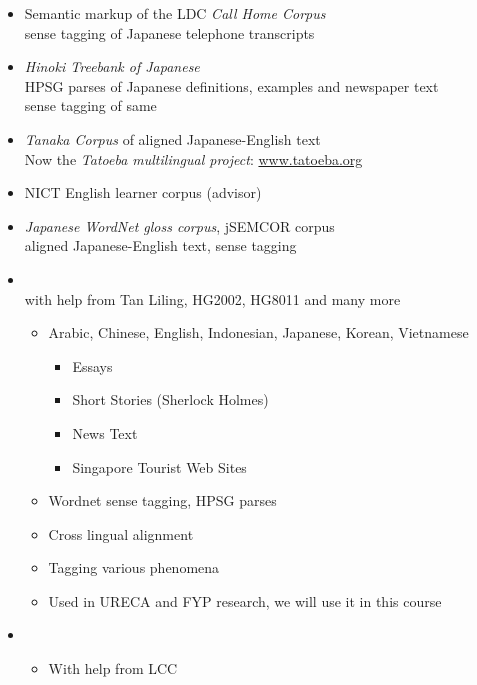 \documentclass[a4paper,landscape,headrule,footrule,xetex]{foils}
\begin{document}
\begin{itemize}
\item Semantic markup of the LDC \textit{Call Home Corpus}
\\ sense tagging of Japanese telephone transcripts
\item \textit{Hinoki Treebank of Japanese}
\\ HPSG parses of Japanese definitions, examples and newspaper text
\\ sense tagging of same
\item \textit{Tanaka Corpus} of aligned Japanese-English text
\\ Now the \textit{Tatoeba multilingual project}: \url{www.tatoeba.org}
\item NICT English learner corpus (advisor)
\item \textit{Japanese WordNet gloss corpus}, jSEMCOR corpus
\\  aligned Japanese-English text, sense tagging
\end{itemize}

\begin{itemize}
\item \textbf{}
\\ with help from Tan Liling, HG2002, HG8011 and many more
  \begin{itemize}
  \item Arabic, Chinese, English, Indonesian, Japanese, Korean, Vietnamese
    \begin{itemize}
    \item Essays
    \item Short Stories (Sherlock Holmes)
    \item News Text
    \item Singapore Tourist Web Sites
    \end{itemize}
  \item Wordnet sense tagging, HPSG parses
  \item Cross lingual alignment
  \item Tagging various phenomena
  \item Used in URECA and FYP research, we will use it in this course
  \end{itemize}
\item {}
  \begin{itemize}
  \item With help from LCC
  \end{itemize}

\end{itemize}
\end{document}
